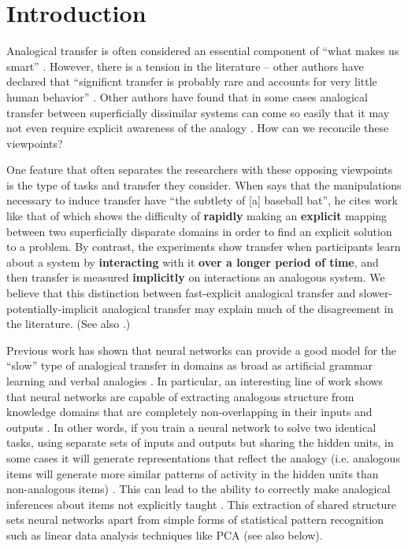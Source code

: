 \documentclass[10pt,letterpaper]{article}
\begin{document}
\section{Introduction}
Analogical transfer is often considered an essential component of ``what makes us smart'' \citep{Gentner2003}. However, there is a tension in the literature -- other authors have declared that ``significnt transfer is probably rare and accounts for very little human behavior'' \citep{Detterman1993}. Other authors have found that in some cases analogical transfer between superficially dissimilar systems can come so easily that it may not even require explicit awareness of the analogy \citep{Day2011}. How can we reconcile these viewpoints? \par
One feature that often separates the researchers with these opposing viewpoints is the type of tasks and transfer they consider. When \citet{Detterman1993} says that the manipulations necessary to induce transfer have ``the subtlety of [a] baseball bat'', he cites work like that of \citet{Gick1980} which shows the difficulty of \textbf{rapidly} making an \textbf{explicit} mapping between two superficially disparate domains in order to find an explicit solution to a problem. By contrast, the \citet{Day2011} experiments show transfer when participants learn about a system by \textbf{interacting} with it \textbf{over a longer period of time}, and then transfer is measured \textbf{implicitly} on interactions an analogous system. We believe that this distinction between fast-explicit analogical transfer and slower-potentially-implicit analogical transfer may explain much of the disagreement in the literature. (See also \citet{Bransford1999}.)\par 
Previous work has shown that neural networks can provide a good model for the ``slow'' type of analogical transfer in domains as broad as artificial grammar learning \citep{Dienes1999} and verbal analogies \cite{Kollias2013}. In particular, an interesting line of work shows that neural networks are capable of extracting analogous structure from knowledge domains that are completely non-overlapping in their inputs and outputs \citep{Hinton1986,Rogers2008a}. In other words, if you train a neural network to solve two identical tasks, using separate sets of inputs and outputs but sharing the hidden units, in some cases it will generate representations that reflect the analogy (i.e. analogous items will generate more similar patterns of activity in the hidden units than non-analogous items) \citep{Rogers2008a}. This can lead to the ability to correctly make analogical inferences about items not explicitly taught \citep{Hinton1986}. This extraction of shared structure sets neural networks apart from simple forms of statistical pattern recognition \citep{Rogers2008a} such as linear data analysis techniques like PCA (see also below). \par
\end{document}
